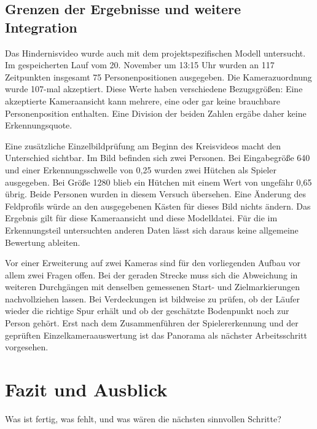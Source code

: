 \subsection{Grenzen der Ergebnisse und weitere Integration}
Das Hindernisvideo wurde auch mit dem projektspezifischen Modell untersucht. Im gespeicherten Lauf vom 20. November um 13:15 Uhr wurden an 117 Zeitpunkten insgesamt 75 Personenpositionen ausgegeben. Die Kamerazuordnung wurde 107-mal akzeptiert. Diese Werte haben verschiedene Bezugsgrößen: Eine akzeptierte Kameraansicht kann mehrere, eine oder gar keine brauchbare Personenposition enthalten. Eine Division der beiden Zahlen ergäbe daher keine Erkennungsquote.

Eine zusätzliche Einzelbildprüfung am Beginn des Kreisvideos macht den Unterschied sichtbar. Im Bild befinden sich zwei Personen. Bei Eingabegröße 640 und einer Erkennungsschwelle von 0,25 wurden zwei Hütchen als Spieler ausgegeben. Bei Größe 1280 blieb ein Hütchen mit einem Wert von ungefähr 0,65 übrig. Beide Personen wurden in diesem Versuch übersehen. Eine Änderung des Feldprofils würde an den ausgegebenen Kästen für dieses Bild nichts ändern. Das Ergebnis gilt für diese Kameraansicht und diese Modelldatei. Für die im Erkennungsteil untersuchten anderen Daten lässt sich daraus keine allgemeine Bewertung ableiten.

Vor einer Erweiterung auf zwei Kameras sind für den vorliegenden Aufbau vor allem zwei Fragen offen. Bei der geraden Strecke muss sich die Abweichung in weiteren Durchgängen mit denselben gemessenen Start- und Zielmarkierungen nachvollziehen lassen. Bei Verdeckungen ist bildweise zu prüfen, ob der Läufer wieder die richtige Spur erhält und ob der geschätzte Bodenpunkt noch zur Person gehört. Erst nach dem Zusammenführen der Spielererkennung und der geprüften Einzelkameraauswertung ist das Panorama als nächster Arbeitsschritt vorgesehen.

\clearpage
\section{Fazit und Ausblick}
\abschnittsautor{\alleautoren}

Was ist fertig, was fehlt, und was wären die nächsten sinnvollen Schritte?